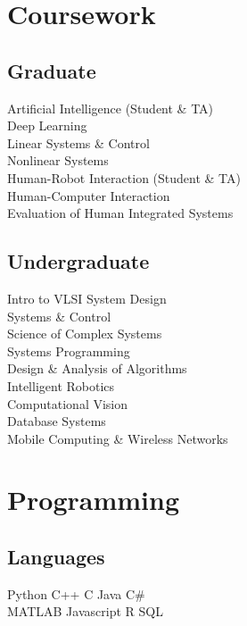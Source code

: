 \documentclass[]{deedy-resume}
\begin{document}
\begin{minipage}[t]{0.33\textwidth}

\vspace{0.3cm}
\section{Coursework}
\subsection{Graduate}
Artificial Intelligence {\scriptsize (Student \& TA)} \\
Deep Learning \\
Linear Systems \& Control \\
Nonlinear Systems \\
Human-Robot Interaction {\scriptsize (Student \& TA)} \\
Human-Computer Interaction \\
Evaluation of Human Integrated Systems \\
\sectionsep

\subsection{Undergraduate}
Intro to VLSI System Design \\
Systems \& Control \\
Science of Complex Systems \\
Systems Programming \\
Design \& Analysis of Algorithms \\
Intelligent Robotics \\
Computational Vision \\
Database Systems \\
Mobile Computing \& Wireless Networks \\


\vspace{0.3cm}
\section{Programming}
\subsection{Languages}
Python \textbullet{} C++ \textbullet{} C \textbullet{} Java \textbullet{} C\# \\
MATLAB \textbullet{} Javascript \textbullet{} R \textbullet{} SQL
\sectionsep


\end{minipage}
\end{document}
